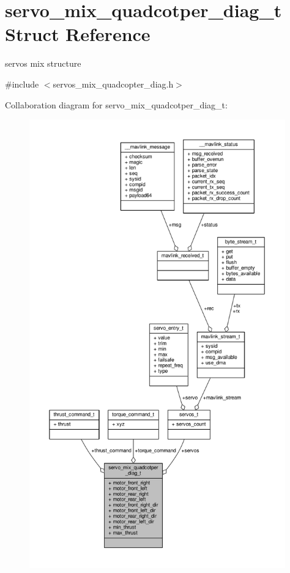 \hypertarget{structservo__mix__quadcotper__diag__t}{\section{servo\+\_\+mix\+\_\+quadcotper\+\_\+diag\+\_\+t Struct Reference}
\label{structservo__mix__quadcotper__diag__t}
}


servos mix structure  




{\ttfamily \#include $<$servos\+\_\+mix\+\_\+quadcopter\+\_\+diag.\+h$>$}



Collaboration diagram for servo\+\_\+mix\+\_\+quadcotper\+\_\+diag\+\_\+t\+:
\nopagebreak
\begin{figure}[H]
\begin{center}
\leavevmode
\includegraphics[height=550pt]{structservo__mix__quadcotper__diag__t__coll__graph}
\end{center}
\end{figure}
